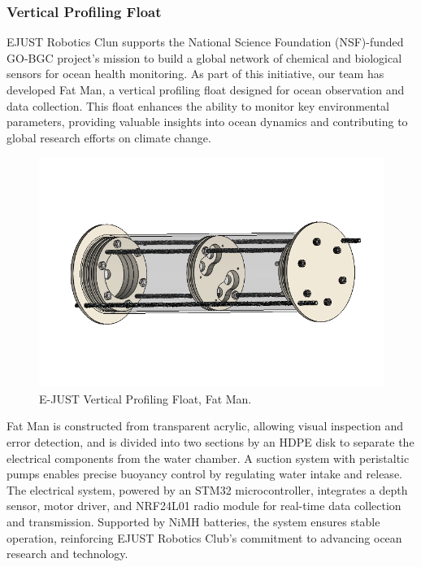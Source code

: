 \subsubsection{Vertical Profiling Float}

EJUST Robotics Clun supports the National Science Foundation (NSF)-funded GO-BGC project’s mission to build a global network of chemical and biological sensors for ocean health monitoring. As part of this initiative, our team has developed Fat Man, a vertical profiling float designed for ocean observation and data collection. This float enhances the ability to monitor key environmental parameters, providing valuable insights into ocean dynamics and contributing to global research efforts on climate change.

\begin{figure}[h]
    \centering
    \includegraphics[width=\columnwidth]{Sections/2Design Rationale/images/float.png}
    \caption{E-JUST Vertical Profiling Float, Fat Man.}
    \label{fig:Float}
\end{figure}

Fat Man is constructed from transparent acrylic, allowing visual inspection and error detection, and is divided into two sections by an HDPE disk to separate the electrical components from the water chamber. A suction system with peristaltic pumps enables precise buoyancy control by regulating water intake and release. The electrical system, powered by an STM32 microcontroller, integrates a depth sensor, motor driver, and NRF24L01 radio module for real-time data collection and transmission. Supported by NiMH batteries, the system ensures stable operation, reinforcing EJUST Robotics Club's commitment to advancing ocean research and technology.
